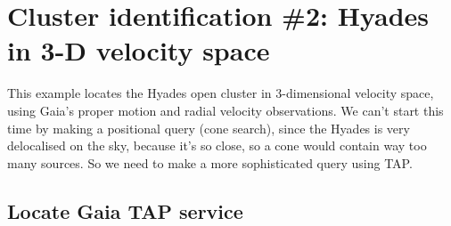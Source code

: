 \documentclass{article}
\begin{document}
\newpage

\section{Cluster identification \#2: Hyades in 3-D velocity space}

This example locates the Hyades open cluster in 3-dimensional velocity space,
using Gaia's proper motion and radial velocity observations.
We can't start this time by making a positional query (cone search),
since the Hyades is very delocalised on the sky, because it's so close,
so a cone would contain way too many sources.
So we need to make a more sophisticated query using TAP.

\subsection{Locate Gaia TAP service}
\end{document}
